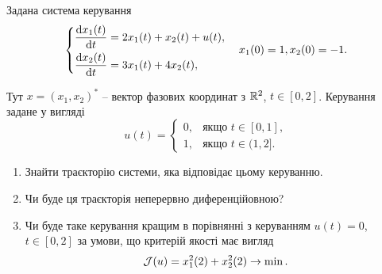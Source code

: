 \begin{problem}
	Задана система керування 
	\[
		\left\{
			\begin{aligned}
				\dfrac{\mathop{}\!\mathrm{d} x_1(t)}{\mathop{}\!\mathrm{d} t} &= 2x_1(t) + x_2(t) + u(t), \\
				\dfrac{\mathop{}\!\mathrm{d} x_2(t)}{\mathop{}\!\mathrm{d} t} &= 3x_1(t) + 4x_2(t),
			\end{aligned}
		\right.
		\quad
		x_1(0) = 1, x_2(0) = -1.
	\]

	Тут $x = (x_1, x_2)^*$ -- вектор фазових координат з $\mathbb{R}^2$, $t \in [0, 2]$. Керування задане у вигляді
	\[
		u(t) 
		=
		\begin{cases}
			0, & \text{якщо } t \in [0, 1], \\
			1, & \text{якщо } t \in (1, 2].
		\end{cases}
	\]
	
	\begin{enumerate}
		\item Знайти траєкторію системи, яка відповідає цьому керуванню.
		\item Чи буде ця траєкторія неперервно диференційовною?
		\item Чи буде таке керування кращим в порівнянні з керуванням $u(t) = 0$, $t \in [0, 2]$ 
		за умови, що критерій якості має вигляд 
		\[ \mathcal{J} (u) = x_1^2(2) + x_2^2(2) \to \min. \]
	\end{enumerate}
\end{problem}

